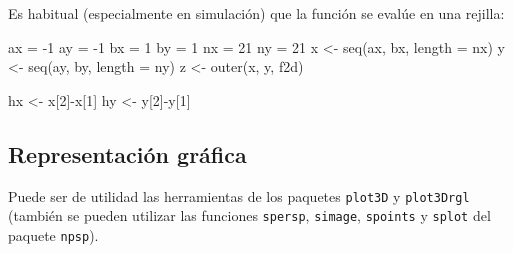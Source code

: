 \documentclass[
]{book}
\newenvironment{Shaded}{\begin{snugshade}}{\end{snugshade}}
\newcommand{\AttributeTok}[1]{\textcolor[rgb]{0.77,0.63,0.00}{#1}}
\newcommand{\DecValTok}[1]{\textcolor[rgb]{0.00,0.00,0.81}{#1}}
\newcommand{\FunctionTok}[1]{\textcolor[rgb]{0.00,0.00,0.00}{#1}}
\newcommand{\NormalTok}[1]{#1}
\newcommand{\OtherTok}[1]{\textcolor[rgb]{0.56,0.35,0.01}{#1}}
\newcommand{\SpecialCharTok}[1]{\textcolor[rgb]{0.00,0.00,0.00}{#1}}
\theoremstyle{break}
\theoremstyle{nonumberplain}
\begin{document}
Es habitual (especialmente en simulación) que la función se evalúe en una rejilla:

\begin{Shaded}
\begin{Highlighting}[]
\NormalTok{ax }\OtherTok{=} \SpecialCharTok{{-}}\DecValTok{1}
\NormalTok{ay }\OtherTok{=} \SpecialCharTok{{-}}\DecValTok{1}
\NormalTok{bx }\OtherTok{=} \DecValTok{1}
\NormalTok{by }\OtherTok{=} \DecValTok{1}
\NormalTok{nx }\OtherTok{=} \DecValTok{21}
\NormalTok{ny }\OtherTok{=} \DecValTok{21}
\NormalTok{x }\OtherTok{\textless{}{-}} \FunctionTok{seq}\NormalTok{(ax, bx, }\AttributeTok{length =}\NormalTok{ nx)}
\NormalTok{y }\OtherTok{\textless{}{-}} \FunctionTok{seq}\NormalTok{(ay, by, }\AttributeTok{length =}\NormalTok{ ny)}
\NormalTok{z }\OtherTok{\textless{}{-}} \FunctionTok{outer}\NormalTok{(x, y, f2d)}

\NormalTok{hx }\OtherTok{\textless{}{-}}\NormalTok{ x[}\DecValTok{2}\NormalTok{]}\SpecialCharTok{{-}}\NormalTok{x[}\DecValTok{1}\NormalTok{]}
\NormalTok{hy }\OtherTok{\textless{}{-}}\NormalTok{ y[}\DecValTok{2}\NormalTok{]}\SpecialCharTok{{-}}\NormalTok{y[}\DecValTok{1}\NormalTok{]}
\end{Highlighting}
\end{Shaded}

\hypertarget{representaciuxf3n-gruxe1fica}{%
\subsection{Representación gráfica}\label{representaciuxf3n-gruxe1fica}}

Puede ser de utilidad las herramientas de los paquetes \texttt{plot3D} y \texttt{plot3Drgl}
(también se pueden utilizar las funciones \texttt{spersp}, \texttt{simage}, \texttt{spoints} y \texttt{splot}
del paquete \texttt{npsp}).
\end{document}
